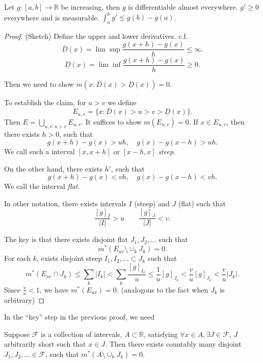 		\begin{theorem}
	Let $g:[a,b] \to \mathbb{R}$ be increasing, then $g$ is differentiable almost everywhere. $g' \ge 0$ everywhere and is measurable. $\int _a^b g' \le g(b) - g(a)$.
\end{theorem}
\begin{proof}
	(Sketch)
	Define the upper and lower derivatives. c.f. 
	\[
		\overline{D} (x) = \lim \sup \frac{g(x+h) - g(x)}{h} \le \infty 
	.\] 
	\[
		\underline{D}(x) = \lim \inf  \frac{g(x+h) - g(x)}{h} \ge 0
	.\] 

	Then we need to show $m\left( x: \overline{D} (x) > \underline{D}(x) \right) =0$.

	To establish the claim, for $u > v$ we define
	\[
		E _{u, v} = \{x: \overline{D} (x) > u > v > \underline{D}(x) \} 
	.\] 
	Then $E = \bigcup_{u, v:u> v} E_{u, v}$. It suffices to show $m(E_{u, v}) = 0$. If $x \in E_{u, v}$, then there exists $h>0$, such that
	\[
		g(x+h) - g(x) > u h, \quad g(x) - g(x-h) > u h
	.\] We call such a interval $[x, x+h]$ or $[x-h, x]$ \textit{steep}.

	On the other hand, there exists $h'$, such that
	\[
		g(x+h) - g(x) < v h, \quad g(x) - g(x-h) < v h
	.\] 
	We call the interval \textit{flat}.



In other notation, there exists intervals  $I$ (steep) and $J$ (flat) such that
\[
	\frac{[g]_I}{|I|}> u \qquad \frac{[g]_J}{|J|} < v
.\] 

The key is that there exists disjoint flat $J_1, J_2,\ldots$ such that
\[
	m^*\left(E_{uv} \setminus \cup_k J_k\right) = 0
.\] 
For each $k$, exists disjoint steep $I_1, I_2,\ldots \subset J_k$ such that 
 \[
	 m^*(E_{uv} \cap J_k) \le \sum_k |I_k| < \sum_k \frac{[g]_{I_k}}{u} \le  \frac{1}{u} [g]_{J_k} < \frac{v}{u} [g] _{J_k} < \frac{v}{u} |J_k|
.\] 
	Since $\frac{v}{u}<1$, we have $m^*(E_{uv}) =0$. (analogous to the fact when $J_k$ is arbitrary)

\end{proof}

In the ``key'' step in the previous proof, we need

\begin{theorem}
	Suppose $\mathcal{F}$ is a collection of intervals, $A \subset \mathbb{R}$, satisfying $\forall x \in A, \exists  J \in \mathcal{F}$, $J$ arbitrarily short such that $x \in J$. Then there exists countably many disjoint $J_1, J_2, \ldots \in \mathcal{F}$, such that $m^*(A \setminus \cup _k J_k) = 0$. 
\end{theorem}

